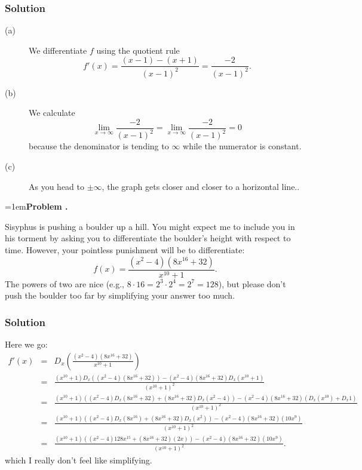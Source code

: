 \documentclass[11pt]{article}
\newcounter{problem}
\newenvironment{problem}[1][]
{\begin{flushleft}\hangindent=1em\hangafter=1\noindent\textbf{Problem \arabic{problem}.}
\ifthenelse{\equal{#1}{}}{}{
\textbf{(#1 \ifthenelse{\equal{#1}{1}}{point}{points}).}}
}
{\addtocounter{problem}{1}\end{flushleft}}
\begin{document}
\begin{solution}
\subsubsection*{Solution}

\begin{description}
\item[(a)] We differentiate $f$ using the quotient rule
$$
f'(x) = \frac{(x-1) - (x+1)}{(x-1)^2} = \frac{-2}{(x-1)^2}.
$$
\item[(b)] We calculate
$$
\lim_{x \to \infty} \frac{-2}{(x-1)^2} = \lim_{x \to \infty} \frac{-2}{(x-1)^2} = 0
$$
because the denominator is tending to $\infty$ while the numerator is constant.
\item[(c)] As you head to $\pm \infty$, the graph gets closer and closer to a horizontal line..
\end{description}
\end{solution}

\begin{problem}[3]
Sisyphus is pushing a boulder up a hill.  You might expect me to
include you in his torment by asking you to differentiate the
boulder's height with respect to time.  However, your pointless
punishment will be to differentiate:
$$
f(x) = \frac{(x^2 - 4)(8x^{16} + 32)}{x^{10} + 1}.
$$
The powers of two are nice (e.g., $8 \cdot 16 = 2^3 \cdot 2^4 = 2^7
= 128$), but please don't push the boulder too far by simplifying your
answer too much.
\end{problem}

\begin{solution}
\subsubsection*{Solution}

Here we go:
\begin{eqnarray*}
f'(x)
&=& D_x \left( \frac{(x^2 - 4)(8x^{16} + 32)}{x^{10} + 1} \right) \\
&=& \frac{(x^{10} + 1) D_x \left( (x^2 - 4)(8x^{16} + 32) \right) -
(x^2 - 4)(8x^{16} + 32) D_x \left( x^{10} + 1 \right)}{\left(x^{10} + 1\right)^2} \\
&=& \frac{(x^{10} + 1) \left( (x^2-4) D_x (8x^{16} + 32) + (8x^{16} + 32) D_x (x^2 - 4) \right) -
(x^2 - 4)(8x^{16} + 32) \left( D_x (x^{10}) + D_x 1 \right)}{\left(x^{10} + 1\right)^2} \\
&=& \frac{(x^{10} + 1) \left( (x^2-4) D_x (8x^{16}) + (8x^{16} + 32) D_x (x^2) \right) -
(x^2 - 4)(8x^{16} + 32)(10 x^9) }{\left(x^{10} + 1\right)^2} \\
&=& \frac{(x^{10} + 1) \left( (x^2-4) 128 x^{15} + (8x^{16} + 32) (2x) \right) -
(x^2 - 4)(8x^{16} + 32)(10 x^9) }{\left(x^{10} + 1\right)^2}.
\end{eqnarray*}
which I really don't feel like simplifying.
\end{solution}
\end{document}
